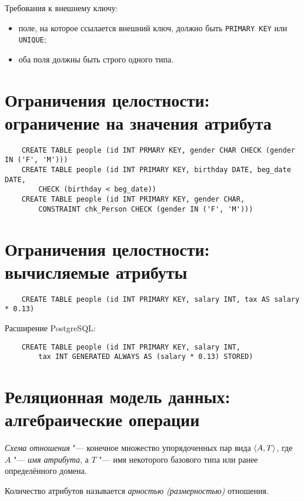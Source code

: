 Требования к внешнему ключу:
\begin{itemize}
	\item поле, на которое ссылается внешний ключ, должно быть \texttt{PRIMARY KEY} или \texttt{UNIQUE};
	\item оба поля должны быть строго одного типа.
\end{itemize}

\section{Ограничения целостности: ограничение на значения атрибута}

\begin{verbatim}
	CREATE TABLE people (id INT PRMARY KEY, gender CHAR CHECK (gender IN ('F', 'M')))
	CREATE TABLE people (id INT PRIMARY KEY, birthday DATE, beg_date DATE,
		CHECK (birthday < beg_date))
	CREATE TABLE people (id INT PRIMARY KEY, gender CHAR,
		CONSTRAINT chk_Person CHECK (gender IN ('F', 'M')))
\end{verbatim}

\section{Ограничения целостности: вычисляемые атрибуты}

\begin{verbatim}
	CREATE TABLE people (id INT PRIMARY KEY, salary INT, tax AS salary * 0.13)
\end{verbatim}

Расширение PostgreSQL:
\begin{verbatim}
	CREATE TABLE people (id INT PRIMARY KEY, salary INT,
		tax INT GENERATED ALWAYS AS (salary * 0.13) STORED)
\end{verbatim}

\section{Реляционная модель данных: алгебраические операции}

\begin{definition}
	\emph{Схема отношения} "--- конечное множество упорядоченных пар вида $ \Braket{A, T} $, где $ A $ "--- \emph{имя атрибута}, а $ T $ "--- имя некоторого базового типа или ранее определённого домена.
\end{definition}

\begin{definition}
	Количество атрибутов называется \emph{арностью (размерностью)} отношения.
\end{definition}

